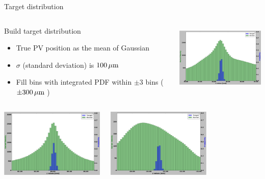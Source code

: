 \begin{frame}{Target distribution}
\vspace{-.8cm}
\begin{columns}[c]
    \begin{block}{Build target distribution}
      \begin{itemize}
          \item True PV position as the mean of Gaussian
          \item $\sigma$ (standard deviation) is $\unit[100]{\mu m}$
          \item Fill bins with integrated PDF within $\pm 3$ bins ($\pm \unit[300]{\mu m}$ )
      \end{itemize}
    \end{block}
      \begin{center}
    \includegraphics[height=3.3cm, trim=18 0 18 0]{images/T_1_25.png}
  \end{center}
  \end{columns}
  \vspace{-.5cm}
  \begin{columns}
      \begin{center}
        \includegraphics[height=3.3cm,trim=18 0 18 0]{images/T_2_25.png}
      \end{center}
      \begin{center}
        \includegraphics[height=3.3cm,trim=18 0 18 0]{images/T_3_25.png}

\end{center}
\end{columns}
\end{frame}
